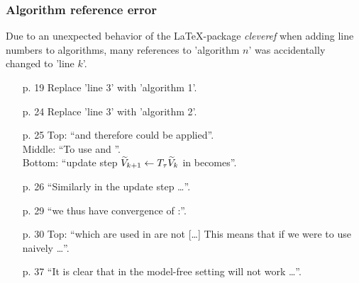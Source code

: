 \documentclass{beamer}[10]
\begin{document}
\begin{frame}
  \frametitle{Algorithm reference error}
  \begingroup
  \footnotesize
  Due to an unexpected behavior of the \LaTeX-package \emph{cleveref}
  when adding line
  numbers to algorithms, many references to 'algorithm $n$'
  was accidentally changed to 'line $k$'.
  \begin{itemize}
    \item[p. 19] 
      Replace 'line 3' with 'algorithm 1'.
    \item[p. 24]
      Replace 'line 3' with 'algorithm 2'.
    \item[p. 25]
      Top: ``and therefore  could be applied''.
      \\Middle: ``To use  and ''.
      \\ Bottom: ``update step $\widetilde{V}_{k+1} \leftarrow T_\tau \widetilde{V}_k$ 
      in  becomes''.
    \item[p. 26] ``Similarly in  the update step \ldots''.
    \item[p. 29] ``we thus have convergence of :''.
    \item[p. 30] Top: ``which are used in  are not [\ldots]
      This means that if we were to use  naively \ldots''.
    \item[p. 37] ``It is clear that in the model-free setting  will not work \ldots''.
  \end{itemize}
  \endgroup
\end{frame}
\end{document}
